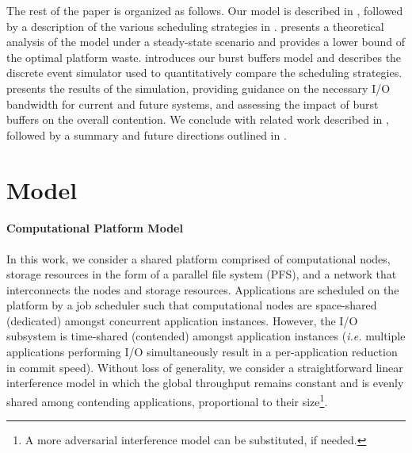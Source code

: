 \documentclass[two]{article}
\newcommand{\ie}[0]{\emph{i.e.}\xspace}
\begin{document}
The rest of the paper is organized as follows. Our model is described in
, followed by a description of the various scheduling strategies in
.  presents a theoretical analysis of the
model under a steady-state scenario and provides a lower bound of the optimal
platform waste.  introduces our burst buffers model and
 describes the discrete event simulator used to quantitatively
compare the scheduling strategies.   presents the results of the
simulation, providing guidance on the necessary I/O bandwidth for current and future
systems, and assessing the impact of burst buffers on the overall contention. We
conclude with related work described in , followed by a summary and
future directions outlined in .



%

\section{Model}
\label{sec:model}

\paragraph*{Computational Platform Model}

In this work, we consider a shared platform comprised of computational
nodes, storage resources in the form of a parallel file system (PFS), and a network
that interconnects the nodes and storage resources. Applications are
scheduled on the platform by a job scheduler such that computational nodes are
space-shared (dedicated) amongst concurrent application instances. However, the I/O
subsystem is time-shared (contended) amongst application instances  (\ie multiple
applications performing I/O simultaneously result in a per-application reduction
in commit speed). Without loss of generality, we consider a straightforward linear
interference model in which the global throughput remains constant and is evenly
shared among contending applications, proportional to their size\footnote{A more
adversarial interference model can be substituted, if needed.}.
\end{document}
